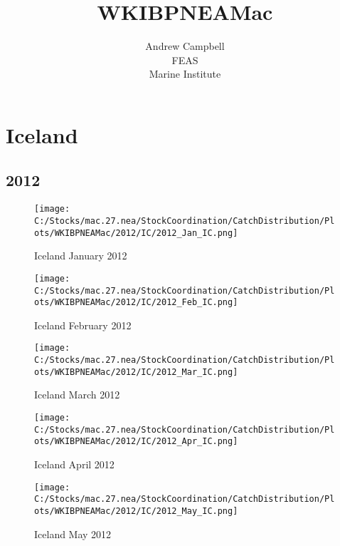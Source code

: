 \documentclass{article}
\begin{document}
\title{WKIBPNEAMac}
\author{Andrew Campbell \\ FEAS \\ Marine Institute}
\maketitle

\tableofcontents

\section{Iceland}



\newpage

\subsection{2012}



\begin{figure}[h]
	\centering
		\texttt{[image: C:/Stocks/mac.27.nea/StockCoordination/CatchDistribution/Plots/WKIBPNEAMac/2012/IC/2012\_Jan\_IC.png]}
	\caption{Iceland January 2012}
	\label{fig:2012_Jan_IC}
\end{figure}

\begin{figure}
	\centering
		\texttt{[image: C:/Stocks/mac.27.nea/StockCoordination/CatchDistribution/Plots/WKIBPNEAMac/2012/IC/2012\_Feb\_IC.png]}
	\caption{Iceland February 2012}
	\label{fig:2012_Feb_IC}
\end{figure}

\begin{figure}
	\centering
		\texttt{[image: C:/Stocks/mac.27.nea/StockCoordination/CatchDistribution/Plots/WKIBPNEAMac/2012/IC/2012\_Mar\_IC.png]}
	\caption{Iceland March 2012}
	\label{fig:2012_Mar_IC}
\end{figure}

\begin{figure}
	\centering
		\texttt{[image: C:/Stocks/mac.27.nea/StockCoordination/CatchDistribution/Plots/WKIBPNEAMac/2012/IC/2012\_Apr\_IC.png]}
	\caption{Iceland April 2012}
	\label{fig:2012_Apr_IC}
\end{figure}

\begin{figure}
	\centering
		\texttt{[image: C:/Stocks/mac.27.nea/StockCoordination/CatchDistribution/Plots/WKIBPNEAMac/2012/IC/2012\_May\_IC.png]}
	\caption{Iceland May 2012}
	\label{fig:2012_May_IC}
\end{figure}
\end{document}
